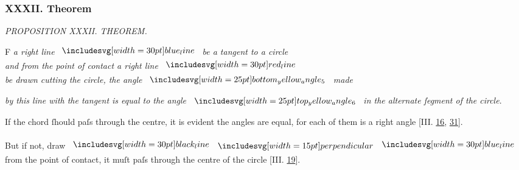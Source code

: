 \documentclass[12pt,preview]{standalone}
\begin{document}
\subsubsection{XXXII. Theorem}

\begin{minipage}[t]{0.33\textwidth}
    \vspace{40pt}
    
\end{minipage}%
\hfill
\begin{minipage}[t]{0.64\textwidth}
    \vspace{0pt}

    \begin{center}
        \textit{PROPOSITION XXXII. THEOREM.}\label{book3pr32} \\
    \end{center}

    \hfill

    \begin{center}
        \raggedright \lettrine[lines=4, loversize=1, nindent=0pt]{}{}F \textit{a right line} $\blueline$ \textit{be a tangent to a circle\\ and from the point of contact a right line} $\redline$\\ \textit{be drawn cutting the circle, the angle} $\img{bottom_yellow_angle_5}$ \textit{made}
    \end{center}
    \raggedright \textit{by this line with the tangent is equal to the angle} $\img{top_yellow_angle_6}$ \textit{in the alternate ſegment of the circle}.

    \hfill

    \hfill

    \raggedright If the chord ſhould paſs through the centre, it is evident the angles are equal, for each of them is a right angle [\textsc{III.} \hyperref[book3pr16]{16}, \hyperref[book3pr31]{31}].\\
    \hfill\\
    But if not, draw $\blackline \bperp \blueline$ from the point of contact, it muſt paſs through the centre of the circle [\textsc{III.} \hyperref[book3pr19]{19}].

    \hfill


\end{minipage}
\end{document}
